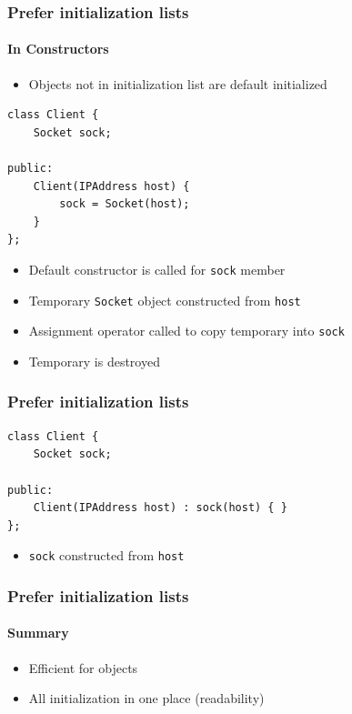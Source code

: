 \documentclass[table]{beamer}
\newcounter{rulecount}
\newcommand{\declarerule}{\textbf{\color{themeblue}{Rule \therulecount:}} }
\begin{document}

\begin{frame}[fragile]
    \frametitle{\declarerule Prefer initialization lists}
    \framesubtitle{In Constructors}
    \begin{itemize}
        \item Objects not in initialization list are default initialized
    \end{itemize}
    \begin{lstlisting}[title=Assignment in constructor]
class Client {
    Socket sock;

public:
    Client(IPAddress host) {
        sock = Socket(host);
    }
};
    \end{lstlisting}
    \begin{itemize}
        \item Default constructor is called for \texttt{sock} member
        \item Temporary \texttt{Socket} object constructed from \texttt{host}
        \item Assignment operator called to copy temporary into \texttt{sock}
        \item Temporary is destroyed
    \end{itemize}
\end{frame}

\begin{frame}[fragile]
    \frametitle{\declarerule Prefer initialization lists}
    \begin{lstlisting}[title=Initialization list]
class Client {
    Socket sock;

public:
    Client(IPAddress host) : sock(host) { }
};
    \end{lstlisting}
    \begin{itemize}
        \item \texttt{sock} constructed from \texttt{host}
    \end{itemize}
\end{frame}

\begin{frame}[fragile]
    \frametitle{\declarerule Prefer initialization lists}
    \framesubtitle{Summary}
    \begin{itemize}
        \item Efficient for objects
        \item All initialization in one place (readability)
    \end{itemize}
\end{frame}
\end{document}
